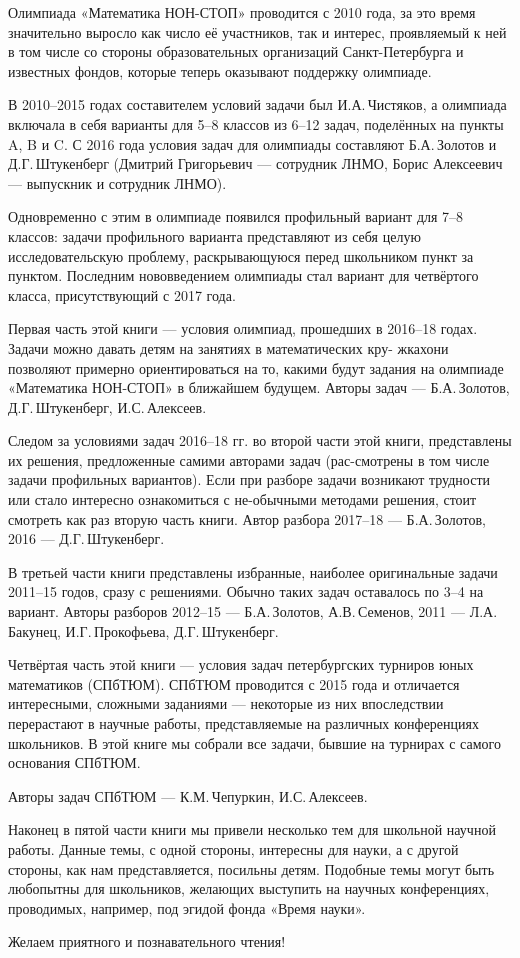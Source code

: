 \noindent\abz Олимпиада «Математика НОН-СТОП» проводится с 2010 года, за это время значительно выросло как число её участников, так и интерес, проявляемый к ней в том числе со стороны образовательных организаций Санкт-Петербурга и известных фондов, которые теперь оказывают поддержку олимпиаде.

\aabz В 2010–2015 годах составителем условий задачи был И.А.\,Чистяков, а олимпиада включала в себя варианты для 5–8 классов из 6–12 задач, поделённых на пункты A, B и C. С 2016 года условия задач для олимпиады составляют Б.А.\,Золотов и Д.Г.\,Штукенберг (Дмитрий Григорьевич — сотрудник ЛНМО, Борис Алексеевич — выпускник и сотрудник ЛНМО).

\aabz Одновременно с этим в олимпиаде появился профильный вариант для 7–8 классов: задачи профильного варианта представляют из себя целую исследовательскую проблему, раскрывающуюся перед школьником пункт за пунктом. Последним нововведением олимпиады стал вариант для четвёртого класса, присутствующий с 2017 года.

\aabz Первая часть этой книги — условия олимпиад, прошедших в 2016–18 годах. Задачи можно давать детям на занятиях в математических кру- жках\scolon они позволяют примерно ориентироваться на то, какими будут задания на олимпиаде «Математика НОН-СТОП» в ближайшем будущем. Авторы задач — Б.А.\,Золотов, Д.Г.\,Штукенберг, И.С.\,Алексеев.

\aabz Следом за условиями задач 2016–18 гг. во второй части этой книги, представлены их решения, предложенные самими авторами задач (рас-\linebreak смотрены в том числе задачи профильных вариантов). Если при разборе задачи возникают трудности или стало интересно ознакомиться с не-\linebreak обычными методами решения, стоит смотреть как раз вторую часть книги. Автор разбора 2017–18 — Б.А.\,Золотов, 2016 — Д.Г.\,Штукенберг.

\aabz В третьей части книги представлены избранные, наиболее оригинальные задачи 2011–15 годов, сразу с решениями. Обычно таких задач оставалось по 3–4 на вариант. Авторы разборов 2012–15 — Б.А.\,Золотов, А.В.\,Семенов, 2011 — Л.А.\,Бакунец, И.Г.\,Прокофьева, Д.Г.\,Штукенберг.

\aabz Четвёртая часть этой книги — условия задач петербургских турниров юных математиков (СПбТЮМ). СПбТЮМ проводится с 2015 года и отличается интересными, сложными заданиями — некоторые из них впоследствии перерастают в научные работы, представляемые на различных конференциях школьников. В этой книге мы собрали все задачи, бывшие на турнирах с самого основания СПбТЮМ.

\aabz Авторы задач СПбТЮМ — К.М.\,Чепуркин, И.С.\,Алексеев.

\thispagestyle{empty}

\aabz Наконец в пятой части книги мы привели несколько тем для школьной научной работы. Данные темы, с одной стороны, интересны для науки, а с другой стороны, как нам представляется, посильны детям. Подобные темы могут быть любопытны для школьников, желающих выступить на научных конференциях, проводимых, например, под эгидой фонда «Время науки».

\aabz Желаем приятного и познавательного чтения!

